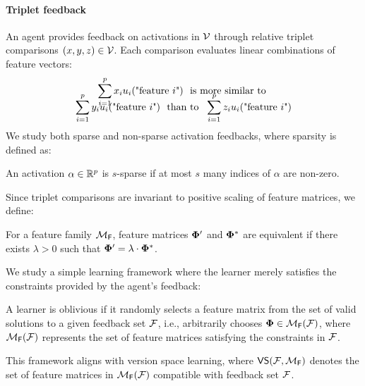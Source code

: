 \paragraph{Triplet feedback} An agent provides feedback on activations in ${\mathcal{V}}$ through relative triplet comparisons $(x,y,z) \in {\mathcal{V}}$. Each comparison evaluates linear combinations of feature vectors:\vspace{-3mm}
\begin{gather*}
\sum_{i=1}^p x_i u_i(\text{"feature $i$"}) \ \text{ is more similar to } \vspace*{-6mm}\\
\sum_{i=1}^p y_i u_i(\text{"feature $i$"}) \ \text{ than to } \
\sum_{i=1}^p z_i u_i(\text{"feature $i$"})
\end{gather*}
 We study both sparse and non-sparse activation feedbacks, where sparsity is defined as:
\begin{definition}[$s$-sparse activations]\label{def: sparse}
An activation $\alpha \in \mathbb{R}^p$ is $s$-sparse if at most $s$ many indices of $\alpha$ are non-zero.\vspace{-3mm}
\end{definition}
Since triplet comparisons are invariant to positive scaling of feature matrices, we define:
\begin{definition}
For a feature family ${\mathcal{M}}_{\textsf{F}}$, feature matrices $\boldsymbol{\Phi}'$ and $\boldsymbol{\Phi}^*$ are equivalent if there exists $\lambda > 0$ such that $\boldsymbol{\Phi}' = \lambda\cdot \boldsymbol{\Phi}^*$.
\end{definition}


We study a simple learning framework where the learner merely satisfies the constraints provided by the agent's feedback:
\begin{definition}
A learner is oblivious if it randomly selects a feature matrix from the set of valid solutions to a given feedback set ${\mathcal{F}}$, i.e., arbitrarily chooses $\boldsymbol{\Phi} \in {\mathcal{M}}_{\textsf{F}}({\mathcal{F}})$, where ${\mathcal{M}}_{\textsf{F}}({\mathcal{F}})$ represents the set of feature matrices satisfying the constraints in ${\mathcal{F}}$.
\end{definition}
This framework aligns with version space learning, where $\textsf{VS}({\mathcal{F}},{\mathcal{M}}_{\textsf{F}})$ denotes the set of feature matrices in ${\mathcal{M}}_{\textsf{F}}({\mathcal{F}})$ compatible with feedback set ${\mathcal{F}}$.

